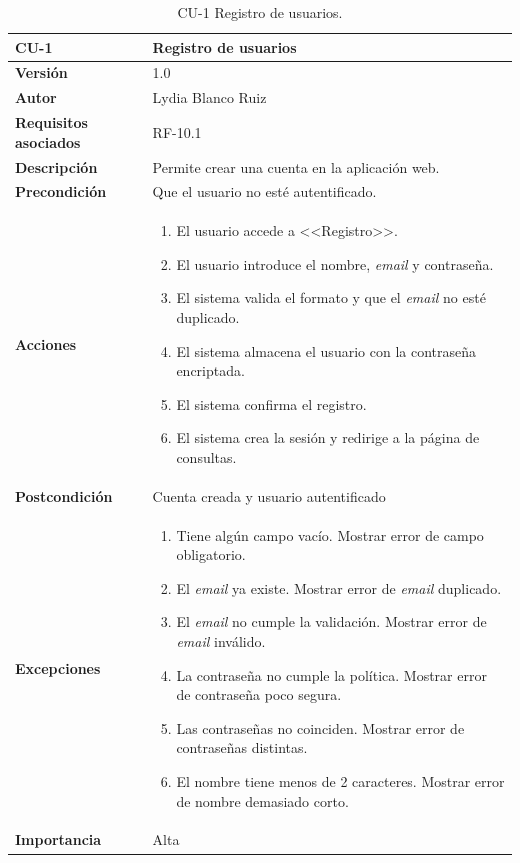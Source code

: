 

\begin{table}[p]
	\centering
	\begin{tabularx}{\linewidth}{ p{} p{} }
		\toprule
		\textbf{CU-1}    & \textbf{Registro de usuarios}\\
		\toprule
		\textbf{Versión}              & 1.0    \\
		\textbf{Autor}                & Lydia Blanco Ruiz \\
		\textbf{Requisitos asociados} & RF-10.1 \\
		\textbf{Descripción}          & Permite crear una cuenta en la aplicación web. \\
		\textbf{Precondición}         & Que el usuario no esté autentificado. \\
		\textbf{Acciones}             &
		\begin{enumerate}
			\def\labelenumi{\arabic{enumi}.}
			\tightlist
			\item El usuario accede a <<Registro>>.
			\item El usuario introduce el nombre, \textit{email} y contraseña.
			\item El sistema valida el formato y que el \textit{email} no esté duplicado.
			\item El sistema almacena el usuario con la contraseña encriptada.
			\item El sistema confirma el registro.
			\item El sistema crea la sesión y redirige a la página de consultas.
		\end{enumerate}\\
		\textbf{Postcondición}        & Cuenta creada y usuario autentificado \\
		\textbf{Excepciones}          & 
		\begin{enumerate}
			\def\labelenumi{\arabic{enumi}.}
			\tightlist
			\item Tiene algún campo vacío. Mostrar error de campo obligatorio.
			\item El \textit{email} ya existe. Mostrar error de \textit{email} duplicado.
			\item El \textit{email} no cumple la validación. Mostrar error de \textit{email} inválido.
			\item La contraseña no cumple la política. Mostrar error de contraseña poco segura.
			\item Las contraseñas no coinciden. Mostrar error de contraseñas distintas.
			\item El nombre tiene menos de 2 caracteres. Mostrar error de nombre demasiado corto.
		\end{enumerate}\\
		\textbf{Importancia}          & Alta  \\
		\bottomrule
	\end{tabularx}
	\caption{CU-1 Registro de usuarios.}
\end{table}

